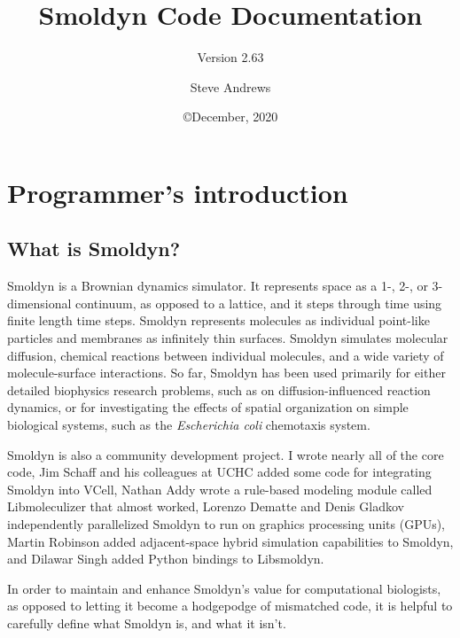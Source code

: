 \documentclass {scrbook}
\begin{document}

\title{Smoldyn Code Documentation} 
\subtitle{Version 2.63}
\date{\copyright December, 2020}
\author{Steve Andrews}
\maketitle

\tableofcontents


\chapter{Programmer's introduction}

\section{What is Smoldyn?}

Smoldyn is a Brownian dynamics simulator. It represents space as a 1-, 2-, or 3-dimensional continuum, as opposed to a lattice, and it steps through time using finite length time steps. Smoldyn represents molecules as individual point-like particles and membranes as infinitely thin surfaces. Smoldyn simulates molecular diffusion, chemical reactions between individual molecules, and a wide variety of molecule-surface interactions. So far, Smoldyn has been used primarily for either detailed biophysics research problems, such as on diffusion-influenced reaction dynamics, or for investigating the effects of spatial organization on simple biological systems, such as the \emph{Escherichia coli} chemotaxis system.

Smoldyn is also a community development project. I wrote nearly all of the core code, Jim Schaff and his colleagues at UCHC added some code for integrating Smoldyn into VCell, Nathan Addy wrote a rule-based modeling module called Libmoleculizer that almost worked, Lorenzo Dematte and Denis Gladkov independently parallelized Smoldyn to run on graphics processing units (GPUs), Martin Robinson added adjacent-space hybrid simulation capabilities to Smoldyn, and Dilawar Singh added Python bindings to Libsmoldyn.

In order to maintain and enhance Smoldyn's value for computational biologists, as opposed to letting it become a hodgepodge of mismatched code, it is helpful to carefully define what Smoldyn is, and what it isn't.
\end{document}
